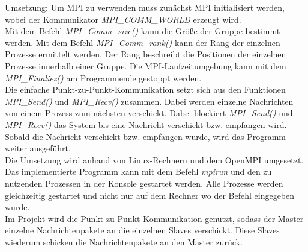 Umsetzung: Um MPI zu verwenden muss zunächst MPI initialisiert werden, wobei der  Kommunikator \textit{MPI\_COMM\_WORLD} erzeugt wird. \\
Mit dem Befehl \textit{MPI\_Comm\_size()} kann die Größe der Gruppe bestimmt werden. Mit dem Befehl \textit{MPI\_Comm\_rank()} kann der Rang der einzelnen Prozesse ermittelt werden. Der Rang beschreibt die Positionen der einzelnen Prozesse innerhalb einer Gruppe.
Die MPI-Laufzeitumgebung kann mit dem \textit{MPI\_Finaliez()} am Programmende gestoppt werden.\\
Die einfache Punkt-zu-Punkt-Kommunikation setzt sich aus den Funktionen \textit{MPI\_Send()} und \textit{MPI\_Recv()} zusammen. Dabei werden einzelne Nachrichten von einem Prozess zum nächsten verschickt. Dabei blockiert \textit{MPI\_Send()} und \textit{MPI\_Recv()} das System bis eine Nachricht verschickt bzw. empfangen wird. Sobald die Nachricht verschickt bzw. empfangen wurde, wird das Programm weiter ausgeführt. \\
Die Umsetzung wird anhand von Linux-Rechnern und dem OpenMPI umgesetzt. Das implementierte Programm kann mit dem Befehl \textit{mpirun} und den zu nutzenden Prozessen in der Konsole gestartet werden. Alle Prozesse werden gleichzeitig gestartet und nicht nur auf dem Rechner wo der Befehl eingegeben wurde.\\
Im Projekt wird die Punkt-zu-Punkt-Kommunikation genutzt, sodass der Master einzelne Nachrichtenpakete an die einzelnen Slaves verschickt. Diese Slaves wiederum schicken die Nachrichtenpakete an den Master zurück.\cite{b1} \\